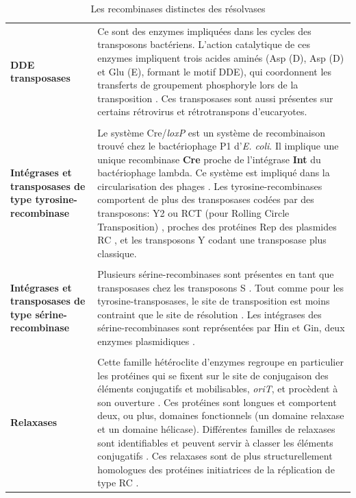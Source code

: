 \begin{longtable}{@{\hspace{-4cm}\hspace{1cm}} >{\bfseries}p{} | >{\small}p{}}
	\caption{Les recombinases distinctes des résolvases}\label{MGE}\\
	\endfirsthead
	DDE transposases & Ce sont des enzymes impliquées dans les cycles des transposons bactériens. L'action catalytique de ces enzymes impliquent trois acides aminés (Asp (D), Asp (D) et Glu (E), formant le motif DDE), qui coordonnent les transferts de groupement phosphoryle lors de la transposition \citep{higgins2005bacterial}. Ces transposases sont aussi présentes sur certains rétrovirus et rétrotranspons d'eucaryotes.\\
	\\[-0.2cm]
	Intégrases et transposases de type tyrosine-recombinase & Le système Cre/\textit{loxP} est un système de recombinaison trouvé chez le bactériophage P1 d'\textit{E. coli}. Il implique une unique recombinase \textbf{Cre} proche de l'intégrase \textbf{Int} du bactériophage lambda. Ce système est impliqué dans la circularisation des phages \citep{hallet2004dna}. Les tyrosine-recombinases comportent de plus des transposases codées par des transposons: Y2 ou RCT (pour Rolling Circle Transposition) \citep{higgins2005bacterial}, proches des protéines Rep des plasmides RC \citep{cornet2004non}, et les transposons Y codant une transposase plus classique.\\
	\\[-0.2cm]
	Intégrases et transposases de type sérine-recombinase & Plusieurs sérine-recombinases sont présentes en tant que transposases chez les transposons S \citep{higgins2005bacterial}. Tout comme pour les tyrosine-transposases, le site de transposition est moins contraint que le site de résolution \citep{cornet2004non}. Les intégrases des sérine-recombinases sont représentées par Hin et Gin, deux enzymes plasmidiques \citep{cornet2004non}. \\ 
	\\[-0.2cm]
 Relaxases & Cette famille hétéroclite d'enzymes regroupe en particulier les protéines qui se fixent sur le site de conjugaison des éléments conjugatifs et mobilisables, \textit{oriT}, et procèdent à son ouverture \citep{Guglielmini2013}. Ces protéines sont longues et comportent deux, ou plus, domaines fonctionnels (un domaine relaxase et un domaine hélicase). Différentes familles de relaxases sont identifiables et peuvent servir à classer les éléments conjugatifs \citep{Guglielmini2013}. Ces relaxases sont de plus structurellement homologues des protéines initiatrices de la réplication de type RC \citep{Smillie2010}.
\end{longtable}
 

